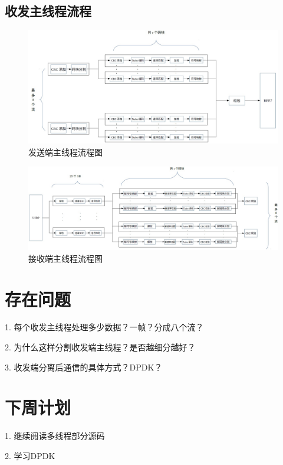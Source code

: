 \documentclass{article}
\begin{document}
\subsection{收发主线程流程}
\begin{figure}[H]
	\centering
	\includegraphics[width = \textwidth]{flow_muti_tx.jpg}
	\caption{发送端主线程流程图}
\end{figure}
\begin{figure}[H]
	\centering
	\includegraphics[width = \textwidth]{flow_muti_rx.jpg}
	\caption{接收端主线程流程图}
\end{figure}

\section{存在问题}
1. 每个收发主线程处理多少数据？一帧？分成八个流？

2. 为什么这样分割收发端主线程？是否越细分越好？

3. 收发端分离后通信的具体方式？DPDK？

\section{下周计划}
1. 继续阅读多线程部分源码

2. 学习DPDK
\end{document}

